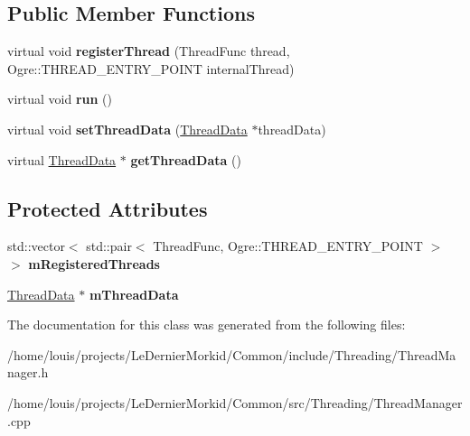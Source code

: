 \subsection*{Public Member Functions}
\begin{DoxyCompactItemize}
\item 
\mbox{\label{class_thread_manager_a7f63f89915ef17f37f741ae29c19682f}} 
virtual void {\bfseries register\+Thread} (Thread\+Func thread, Ogre\+::\+T\+H\+R\+E\+A\+D\+\_\+\+E\+N\+T\+R\+Y\+\_\+\+P\+O\+I\+NT internal\+Thread)
\item 
\mbox{\label{class_thread_manager_afec21d2b814f77ef06221f0529e6e8b4}} 
virtual void {\bfseries run} ()
\item 
\mbox{\label{class_thread_manager_a3dbe938c3fa9b2202d84c5b623db74a4}} 
virtual void {\bfseries set\+Thread\+Data} (\hyperlink{struct_thread_data}{Thread\+Data} $\ast$thread\+Data)
\item 
\mbox{\label{class_thread_manager_a00c6fbd9feafca3e5408bc7a0fa7d0e5}} 
virtual \hyperlink{struct_thread_data}{Thread\+Data} $\ast$ {\bfseries get\+Thread\+Data} ()
\end{DoxyCompactItemize}
\subsection*{Protected Attributes}
\begin{DoxyCompactItemize}
\item 
\mbox{\label{class_thread_manager_a6b3e5e01419d3419ac09cefc6748f9e0}} 
std\+::vector$<$ std\+::pair$<$ Thread\+Func, Ogre\+::\+T\+H\+R\+E\+A\+D\+\_\+\+E\+N\+T\+R\+Y\+\_\+\+P\+O\+I\+NT $>$ $>$ {\bfseries m\+Registered\+Threads}
\item 
\mbox{\label{class_thread_manager_a8bce7db0b6a5369556a31d906cb30ff1}} 
\hyperlink{struct_thread_data}{Thread\+Data} $\ast$ {\bfseries m\+Thread\+Data}
\end{DoxyCompactItemize}


The documentation for this class was generated from the following files\+:\begin{DoxyCompactItemize}
\item 
/home/louis/projects/\+Le\+Dernier\+Morkid/\+Common/include/\+Threading/Thread\+Manager.\+h\item 
/home/louis/projects/\+Le\+Dernier\+Morkid/\+Common/src/\+Threading/Thread\+Manager.\+cpp\end{DoxyCompactItemize}
